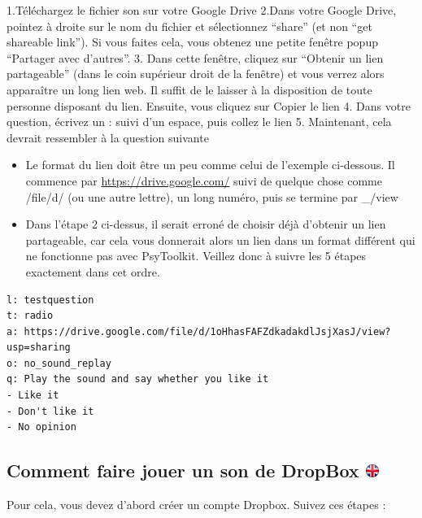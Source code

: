 \documentclass[
]{book}
\providecommand{\tightlist}{%
  \setlength{\itemsep}{0pt}\setlength{\parskip}{0pt}}
\begin{document}
1.Téléchargez le fichier son sur votre Google Drive
2.Dans votre Google Drive, pointez à droite sur le nom du fichier et sélectionnez ``share'' (et non ``get shareable link''). Si vous faites cela, vous obtenez une petite fenêtre popup ``Partager avec d'autres''.
3. Dans cette fenêtre, cliquez sur ``Obtenir un lien partageable'' (dans le coin supérieur droit de la fenêtre) et vous verrez alors apparaître un long lien web. Il suffit de le laisser à la disposition de toute personne disposant du lien. Ensuite, vous cliquez sur Copier le lien
4. Dans votre question, écrivez un : suivi d'un espace, puis collez le lien
5. Maintenant, cela devrait ressembler à la question suivante

\begin{itemize}
\tightlist
\item
  Le format du lien doit être un peu comme celui de l'exemple ci-dessous. Il commence par \url{https://drive.google.com/} suivi de quelque chose comme /file/d/ (ou une autre lettre), un long numéro, puis se termine par \_/view
\item
  Dans l'étape 2 ci-dessus, il serait erroné de choisir déjà d'obtenir un lien partageable, car cela vous donnerait alors un lien dans un format différent qui ne fonctionne pas avec PsyToolkit. Veillez donc à suivre les 5 étapes exactement dans cet ordre.
\end{itemize}

\begin{verbatim}
l: testquestion
t: radio
a: https://drive.google.com/file/d/1oHhasFAFZdkadakdlJsjXasJ/view?usp=sharing
o: no_sound_replay
q: Play the sound and say whether you like it
- Like it
- Don't like it
- No opinion
\end{verbatim}

\hypertarget{comment-faire-jouer-un-son-de-dropbox}{%
\subsection[Comment faire jouer un son de DropBox ]{\texorpdfstring{Comment faire jouer un son de DropBox \href{https://www.psytoolkit.org/lessons/surveyaudiovideo.html\#_how_to_play_a_sound_from_dropbox}{\protect\includegraphics{img/ukflag.png}}}{Comment faire jouer un son de DropBox }}\label{comment-faire-jouer-un-son-de-dropbox}}

Pour cela, vous devez d'abord créer un compte Dropbox. Suivez ces étapes :
\end{document}
